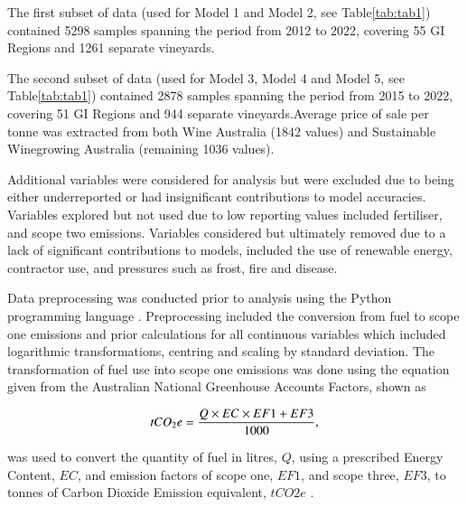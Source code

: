 \documentclass[review,12pt,authoryear]{elsarticle}
\begin{document}
\begin{linenumbers}
\par
The first subset of data (used for Model 1 and Model 2, see Table\ref{tab:tab1}) contained 5298 samples spanning the period from 2012 to 2022, covering 55 GI Regions and 1261 separate vineyards.
\par
The second subset of data (used for Model 3, Model 4 and Model 5, see Table\ref{tab:tab1}) contained 2878 samples spanning the period from 2015 to 2022, covering 51 GI Regions and 944 separate vineyards.Average price of sale per tonne was extracted from both Wine Australia (1842 values) and Sustainable Winegrowing Australia (remaining 1036 values).
\par
Additional variables were considered for analysis but were excluded due to being either underreported or had insignificant contributions to model accuracies. Variables explored but not used due to low reporting values included fertiliser, and scope two emissions. Variables considered but ultimately removed due to a lack of significant contributions to models, included the use of renewable energy, contractor use, and pressures such as frost, fire and disease.
\par
Data preprocessing was conducted prior to analysis using the Python programming language \citep{g.vanrossumPythonTutorialTechnical1995}. Preprocessing included the conversion from fuel to scope one emissions and prior calculations for all continuous variables which included logarithmic transformations, centring and scaling by standard deviation. The transformation of fuel use into scope one emissions was done using the equation given from the Australian National Greenhouse Accounts Factors, shown as
\par
\begin{equation}
\label{(1)}
    tCO_{2}e={{Q \times EC \times EF1 + EF3}\over{1000}},
\end{equation}
\par
was used to convert the quantity of fuel in litres, $Q$, using a prescribed Energy Content, $EC$, and emission factors of scope one, $EF1$, and scope three, $EF3$, to tonnes of Carbon Dioxide Emission equivalent, $tCO2e$ \citep{departmentofclimatechangeenergytheenvironmentandwaterAustralianNationalGreenhouse2022}.
\par


\end{linenumbers}
\end{document}
